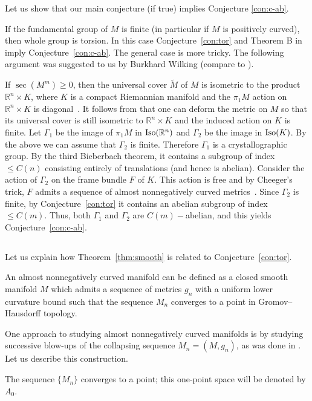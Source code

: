 \documentclass{amsart}
\begin{document}
Let us show that our main conjecture (if true) implies Conjecture \ref{con:c-ab}.

If the fundamental group of $M$ is finite (in particular if $M$ is positively curved), then whole group is torsion.
In this case Conjecture~\ref{con:tor} and Theorem B in \cite{KPT} imply Conjecture~\ref{con:c-ab}.
The general case is more tricky.
The following argument
was suggested to us by Burkhard Wilking (compare to \cite[Corollary 4.6.1]{KPT}).

If $\sec(M^m)\ge0$, then the universal cover $\tilde M$ of $M$ is isometric to the product $\mathbb{R}^n\times K$, where $K$ is a compact Riemannian manifold and the $\pi_1M$ action  on $\mathbb{R}^n\times K$ is diagonal~\cite{CG72}.
It follows from \cite[Cor. 6.3]{wilking} that one can deform the metric on $M$ so that its universal cover is still isometric to $\mathbb{R}^n\times K$ and the induced action on $K$ is finite. Let $\Gamma_1$ be the image of $\pi_1M$ in 
$\mathop{\rm Iso}(\mathbb{R}^n)$ and $\Gamma_2$ be the image in $\mathop{\rm Iso}(K)$. By the above we can assume that $\Gamma_2$ is finite. Therefore $\Gamma_1$ is a crystallographic group. By the third Bieberbach theorem, 
it contains a subgroup of index $\le C(n)$ consisting entirely of translations (and hence is abelian).
Consider the action of $\Gamma_2$ on the frame bundle $F$ of $K$. This action is free and by Cheeger's trick, $F$ admits a sequence of almost nonnegatively curved metrics~\cite{FY}. Since $\Gamma_2$ is finite, by Conjecture~\ref{con:tor} it contains 
an abelian subgroup of index $\le C(m)$. Thus, both $\Gamma_1$ and $\Gamma_2$ are $C(m)-$abelian,
and this yields Conjecture~\ref{con:c-ab}.

\subsection{} Let us explain  how Theorem~\ref{thm:smooth} is related to Conjecture~\ref{con:tor}.

An almost nonnegatively curved manifold can be defined as a closed smooth manifold $M$ which admits a sequence of metrics $g_n$ with a uniform lower curvature bound such that the sequence $M_n$ converges to a point in Gromov--Hausdorff topology.

One approach to studying almost nonnegatively curved manifolds is by studying successive blow-ups of the collapsing sequence $M_n=(M,g_n)$, as was done in \cite[Section 4.3]{KPT}.
Let us describe this construction.

The sequence $\{M_n\}$ converges to a point; this one-point space will be denoted by $A_0$.
\end{document}
